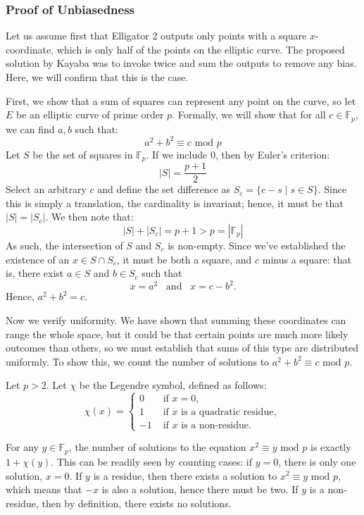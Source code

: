 \documentclass[12pt,titlepage,table]{article}
\begin{document}
\newpage
\subsubsection{Proof of Unbiasedness}
\indent \indent Let us assume first that Elligator 2 outputs only points with a square $x$-coordinate, which is only half of the points on the elliptic curve. The proposed solution by Kayaba was to invoke twice and sum the outputs to remove any bias. Here, we will confirm that this is the case.

\medskip
First, we show that a sum of squares can represent any point on the curve, so let $E$ be an elliptic curve of prime order $p$. Formally, we will show that for all $c \in \mathbb{F}_p$, we can find $a,b$ such that:
$$a^2 + b^2 \equiv c \text{ mod } p$$
Let $S$ be the set of squares in $\mathbb{F}_p$. If we include $0$, then by Euler's criterion:
$$|S| = \frac{p+1}{2}$$
Select an arbitrary $c$ and define the set difference as $S_c = \{c - s \mid s \in S\}$. Since this is simply a translation, the cardinality is invariant; hence, it must be that $|S| = |S_c|$. We then note that:
$$|S| + |S_c| = p + 1 > p = |\mathbb{F}_p|$$
As such, the intersection of $S$ and $S_c$ is non-empty. Since we've established the existence of an $x \in S \cap S_c$, it must be both a square, and $c$ minus a square: that is, there exist $a \in S$ and $b \in S_c$ such that
$$x = a^2 \, \, \, \text{ and } \, \, \, x = c - b^2.$$
Hence, $a^2 + b^2 = c$.

\medskip
Now we verify uniformity. We have shown that summing these coordinates can range the whole space, but it could be that certain points are much more likely outcomes than others, so we must establish that sums of this type are distributed uniformly. To show this, we count the number of solutions to $a^2 + b^2 \equiv c \text{ mod } p$. 

Let $p > 2$. Let $\chi$ be the Legendre symbol, defined as follows:
$$\chi(x) = \begin{cases}
    0 & \text{ if } x = 0, \\
    1 & \text{ if } x \text{ is a quadratic residue}, \\
    -1 & \text{ if } x \text{ is a non-residue}.
\end{cases}$$

For any $y \in \mathbb{F}_p$, the number of solutions to the equation $x^2 \equiv y \text{ mod } p$ is exactly $1+\chi(y)$. This can be readily seen by counting cases: if $y = 0$, there is only one solution, $x = 0$. If $y$ is a residue, then there exists a solution to $x^2 \equiv y \text{ mod } p$, which means that $-x$ is also a solution, hence there must be two. If $y$ is a non-residue, then by definition, there exists no solutions.
\end{document}
